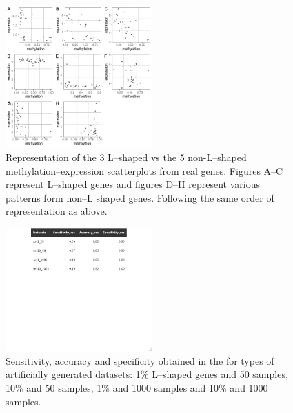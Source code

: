 \documentclass[10pt,letterpaper]{article}
\begin{document}
\begin{figure}
\hypertarget{id}{%
\centering
\includegraphics[width=0.5\textwidth,height=0.3\textheight]{figures/Figure4.png}
\caption{Representation of the 3 L--shaped vs the 5 non-L--shaped
methylation--expression scatterplots from real genes. Figures A--C
represent L--shaped genes and figures D--H represent various patterns
form non--L shaped genes. Following the same order of representation as
above.}\label{id}
}
\end{figure}

\begin{figure}
\hypertarget{id}{%
\centering
\includegraphics[width=0.5\textwidth,height=0.3\textheight]{figures/senspecacc.png}
\caption{Sensitivity, accuracy and specificity obtained in the for types
of artificially generated datasets: 1\% L--shaped genes and 50 samples,
10\% and 50 samples, 1\% and 1000 samples and 10\% and 1000
samples.}\label{id}
}
\end{figure}
\end{document}
